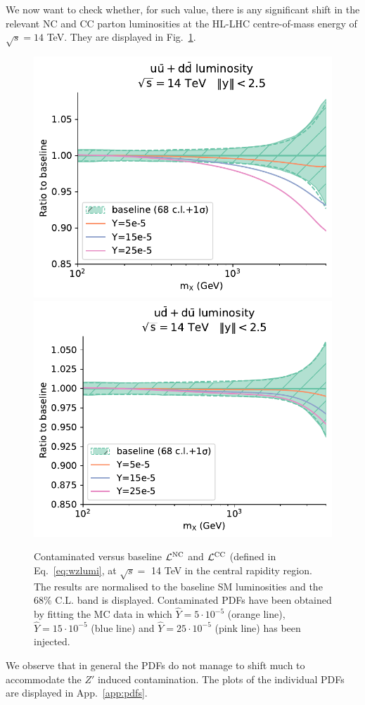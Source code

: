 \documentclass[withindex,glossary]{cam-thesis}
\begin{document}
%

We now want to check whether, for such value, there is any significant
shift in the relevant NC and CC parton luminosities at the HL-LHC centre-of-mass energy of $\sqrt{s}=14$ TeV. They are displayed in 
Fig.~\ref{fig:Ylumi}. 
%      
\begin{figure}[H]
  \includegraphics[width=0.49\linewidth]{Figures/dataspecs0_Lumi_channels0_plot_lumi1d.pdf}
  \includegraphics[width=0.49\linewidth]{Figures/dataspecs0_Lumi_channels1_plot_lumi1d.pdf}
	\caption{Contaminated versus baseline ${\cal L^{\rm NC}}$ and ${\cal L^{\rm CC}}$ (defined in Eq.~\eqref{eq:wzlumi},
        at $\sqrt{s}=$ 14 TeV in the central rapidity region. The results are normalised to the baseline SM luminosities and the 68\% C.L. band 
        is displayed. Contaminated PDFs have been obtained by fitting the MC data in which $\hat{Y}=5\cdot 10^{-5}$ (orange line),
        $\hat{Y}=15\cdot 10^{-5}$ (blue line) and $\hat{Y}=25\cdot 10^{-5}$ (pink line) has been injected.}
	\label{fig:Ylumi}
      \end{figure}
We observe that in general the PDFs do not manage to shift much to accommodate the $Z'$ induced contamination. The plots of the individual PDFs are displayed in App.~\ref{app:pdfs}. 
\end{document}
